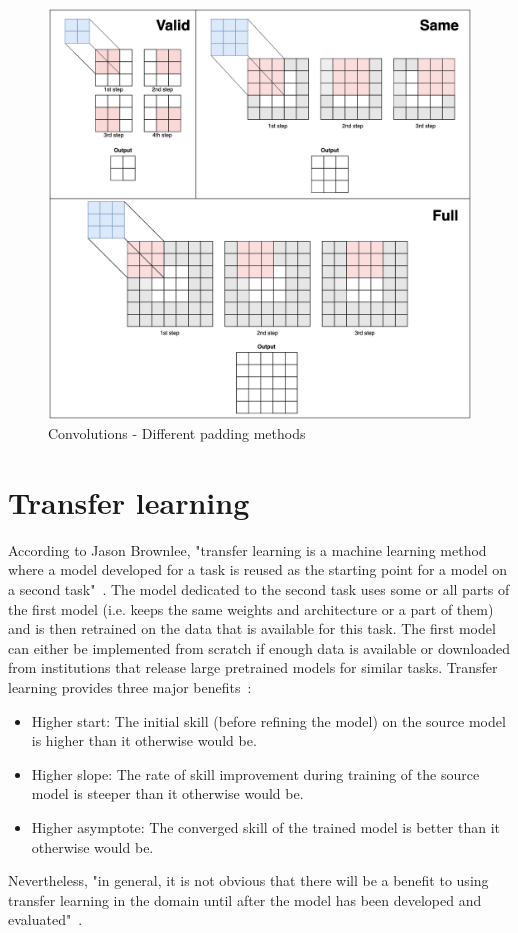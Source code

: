 \begin{figure}[!h]
\centering
\includegraphics[width=1\textwidth, keepaspectratio=true]{./figures/convolution_padding.png}
\caption{Convolutions - Different padding methods}
\label{fig:convolution_padding}
\end{figure}



\section{Transfer learning}
\setlength{\marginparwidth}{3cm}\leavevmode {}According to Jason Brownlee, "transfer learning is a machine learning method where a model developed for a task is reused as the starting point for a model on a second task"~\cite{30}. The model dedicated to the second task uses some or all parts of the first model (i.e. keeps the same weights and architecture or a part of them) and is then retrained on the data that is available for this task. The first model can either be implemented from scratch if enough data is available or downloaded from institutions that release large pretrained models for similar tasks. Transfer learning provides three major benefits~\cite{30}:
\begin{itemize}
\item Higher start: The initial skill (before refining the model) on the source model is higher than it otherwise would be.
\item Higher slope: The rate of skill improvement during training of the source model is steeper than it otherwise would be.
\item Higher asymptote: The converged skill of the trained model is better than it otherwise would be.
\end{itemize}
Nevertheless, "in general, it is not obvious that there will be a benefit to using transfer learning in the domain until after the model has been developed and evaluated"~\cite{30}.

